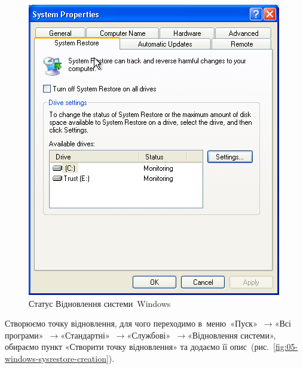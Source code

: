 \documentclass[
	a4paper,
	oneside,
	DIV = 12,
	fontsize = 13pt,
	headings = normal,
]{scrartcl}
\newcommand{\Mytextrightarrow}{$\rightarrow$\hspace{0.25em}}
\begin{document}
			\begin{figure}[!htbp]
				\centering
				\includegraphics[height = 8\baselineskip]{./assets/y03s01-pcdiag-lab-04-p07.png}
				\caption{Статус Відновлення системи~\textenglish{Windows}}
				\label{fig:04-windows-sysrestore-disk-status}
			\end{figure}

			Створюємо точку відновлення, для чого переходимо в~меню~«Пуск»~\Mytextrightarrow «Всі програми»~\Mytextrightarrow «Стандартні»~\Mytextrightarrow «Службові»~\Mytextrightarrow «Відновлення системи», обираємо пункт «Створити точку відновлення» та додаємо її опис~(рис.~\ref{fig:05-windows-sysrestore-creation}).
\end{document}

